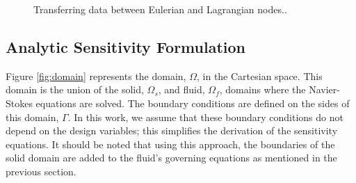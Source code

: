 \documentclass[12pt]{aiaa-pretty}
\begin{document}
%
\begin{figure}[H]
	\centering
	\quad
	\quad
	\caption{Transferring data between Eulerian and Lagrangian nodes..}
	\label{fig:mappingDataE2L}
\end{figure}
%

\subsection{Analytic Sensitivity Formulation}
Figure \ref{fig:domain} represents the domain, $\Omega$, in the Cartesian space. This domain is the union of the solid, $\Omega_s$, and fluid, $\Omega_f$, domains where the Navier-Stokes equations are solved. The boundary conditions are defined on the sides of this domain, $\Gamma$. In this work, we assume that these boundary conditions do not depend on the design variables; this simplifies the derivation of the sensitivity equations. It should be noted that using this approach, the boundaries of the solid domain are added to the fluid's governing equations as mentioned in the previous section.
\end{document}
